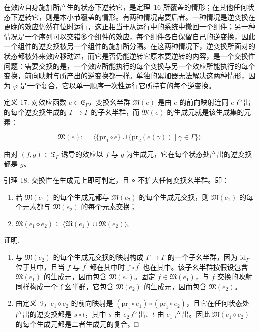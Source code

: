 在效应自身施加所产生的状态下逆转它，是定理~16 所覆盖的情形；在其他任何状态下逆转它，则是本小节覆盖的情形。有两种情况需要后者。一种情况是逆变换在更晚的效应仍然在位时运行，这正相当于从运行中的系统中撤回一个组件；另一种情况是一个序列可以交错多个组件的效应，每个组件各自保留自己的逆变换，因此一个组件的逆变换被另一个组件的施加所分隔。在这两种情况下，逆变换所面对的状态都被外来效应移动过，而它是否仍能逆转它原本要逆转的内容，是一个交换性问题：需要交换的是，一个效应所能执行的每个变换与另一个效应所能执行的每个变换，前向映射与所产出的逆变换都一样。单独的累加器无法解决这两种情形，因为 \(\varphi\) 是一个复合，它以单一顺序一次性运行它所持有的每个逆变换。

定义 17. 对效应函数 \(e \in \mathfrak { E } _ { \Gamma }\)，变换幺半群
\(\mathfrak { M } ( e )\) 是由 \(e\) 的前向映射连同 \(e\) 产出的每个逆变换生成的
\(\Gamma \to \Gamma\) 的子幺半群，而 \(\mathfrak { M } ( e )\) 的生成元就是该生成集的元素：

\[
\mathfrak { M } ( e ) : = \langle \{ \mathrm { p r } _ { 1 } \circ e \} \cup \{ \mathrm { p r } _ { 2 } ( e ( \gamma ) ) \mid \gamma \in \Gamma \} \rangle\tag{17}
\]

由对 \(( f , g ) \in \mathfrak { T } _ { \Gamma }\) 诱导的效应以 \(f\) 与 \(g\) 为生成元，它在每个状态处产出的逆变换都是 \(g\)。

引理 18. 交换性在生成元上即可判定，且 ⋄ 不扩大任何变换幺半群。即：

\begin{enumerate}
\def\labelenumi{\arabic{enumi}.}
\item
  若 \(\mathfrak { M } ( e _ { 1 } )\) 的每个生成元都与 \(\mathfrak { M } ( e _ { 2 } )\) 的每个生成元交换，则
  \(\mathfrak { M } ( e _ { 1 } )\) 的每个元素都与 \(\mathfrak { M } ( e _ { 2 } )\) 的每个元素交换；
\item
  \(\mathfrak { M } ( e _ { 1 } \diamond e _ { 2 } ) \subseteq \langle \mathfrak { M } ( e _ { 1 } ) \cup \mathfrak { M } ( e _ { 2 } ) \rangle\)。
\end{enumerate}

证明.

\begin{enumerate}
\def\labelenumi{\arabic{enumi}.}
\item
  与 \(\mathfrak { M } ( e _ { 2 } )\) 的每个生成元交换的映射构成 \(\Gamma \to \Gamma\) 的一个子幺半群，因为
  \(\mathrm { i d } _ { \Gamma }\) 位于其中，且当 \(f\) 与 \(f ^ { \prime }\) 都在其中时
  \(f \circ f ^ { \prime }\) 也在其中。该子幺半群按假设包含 \(\mathfrak { M } ( e _ { 1 } )\) 的生成元，因而包含
  \(\mathfrak { M } ( e _ { 1 } )\)。固定 \(f \in \mathfrak { M } ( e _ { 1 } )\)，与 \(f\) 交换的映射同样构成一个子幺半群，它包含 \(\mathfrak { M } ( e _ { 2 } )\) 的生成元，因而包含
  \(\mathfrak { M } ( e _ { 2 } )\)。
\item
  由定义~9，\(e _ { 1 } \diamond e _ { 2 }\) 的前向映射是
  \(\left( \mathrm { p r } _ { 1 } \circ e _ { 1 } \right) \circ \left( \mathrm { p r } _ { 1 } \circ e _ { 2 } \right)\)，且它在任何状态处产出的逆变换都是 \(s \circ t\)，其中 \(s\) 由 \(e _ { 2 }\) 产出、\(t\) 由 \(e _ { 1 }\) 产出。因此
  \(\mathfrak { M } ( e _ { 1 } \diamond e _ { 2 } )\) 的每个生成元都是二者生成元的复合。□
\end{enumerate}

